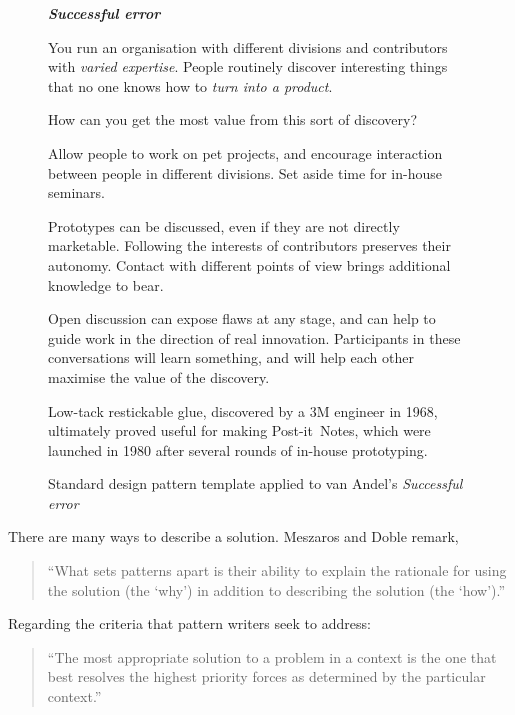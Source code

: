 \begin{figure}[!t]
{\normalsize
\begin{mdframed}
\vspace{2mm}
\textbf{\emph{Successful error}}~
\begin{description}[leftmargin=0\parindent,labelindent=0em,itemsep=2pt]
\item[{Context.}] You run an organisation with different
  divisions and contributors with {\sl varied expertise}.  People routinely
  discover interesting things that no one knows how to {\sl
    turn into a product}.
\item[{Problem.}]  How can you get the most value from this sort of discovery?
\item[{Solution.}] Allow people to work on pet projects, and encourage
  interaction between people in different divisions.  Set aside time
  for in-house seminars.
\item[{Rationale.}] Prototypes can be discussed, even if they are not
  directly marketable.  Following the interests of contributors
  preserves their autonomy.  Contact with different points of view
  brings additional knowledge to bear.
\item[{Resolution.}] 
Open discussion can
  expose flaws at any stage, and can help to guide work in the direction of
  real innovation.  Participants in these conversations
  will learn something, and will help each other maximise the value of
  the discovery.  
\item[{Example.}] Low-tack restickable glue, discovered by a 3M
  engineer in 1968, ultimately proved useful for making
  Post-it\texttrademark\ Notes, which were launched in 1980 after
  several rounds of in-house prototyping.
\end{description}
\vspace{-1mm}
\end{mdframed}
}
\caption{Standard design pattern template applied to van Andel's \em{Successful error}\label{fig:va-pattern-figure}}
\end{figure}

\noindent There are many ways to describe a solution. Meszaros and Doble remark,
\begin{quote}
\noindent ``What sets patterns apart is their ability to explain the
rationale for using the solution (the `why') in addition to describing
the solution (the `how').''
\end{quote}
Regarding the criteria that pattern writers seek to address: 
\begin{quote}
\noindent ``The most appropriate solution to a problem in a context is
the one that best resolves the highest priority forces as determined
by the particular context.''
\end{quote}

